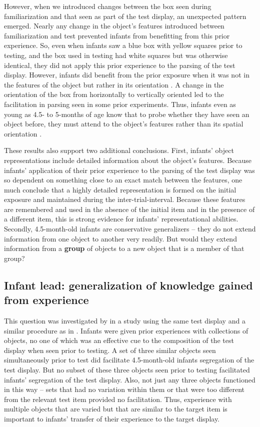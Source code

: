 However, when we introduced changes between the box seen during
familiarization and that seen as part of the test display, an
unexpected pattern emerged.  Nearly any change in the object's
features introduced between familiarization and test prevented infants
from benefitting from this prior experience.  So, even when infants
saw a blue box with yellow squares prior to testing, and the box used
in testing had white squares but was otherwise identical, they did not
apply this prior experience to the parsing of the test display.
However, infants did benefit from the prior exposure when it was not
in the features of the object but rather in its orientation 
 \cite{needham01object}.  
A change in the orientation of the box from horizontally to
vertically oriented led to the facilitation in parsing seen in some
prior experiments.  Thus, infants even as young as 4.5- to 5-months of
age know that to probe whether they have seen an object before, they
must attend to the object's features rather than its spatial
orientation \cite{needham01object}.

These results also support two additional conclusions.  First,
infants' object representations include detailed information
about the object's features.  Because infants'
application of their prior experience to the parsing of the test
display was so dependent on something close to an exact match between
the features, one much conclude that a highly detailed representation
is formed on the initial exposure and maintained during the
inter-trial-interval.  Because these features are remembered and used
in the absence of the initial item and in the presence of a different
item, this is strong evidence for infants' representational
abilities.  Secondly, 4.5-month-old infants are conservative
generalizers -- they do not extend information from one object to
another very readily.  But would they extend information from a {\bf group}
of objects to a new object that is a member of that group?



\subsection{Infant lead: generalization of knowledge gained from experience}

This question was investigated by 
in a study using the same test display and a similar procedure as in
.  Infants were given prior experiences with collections
of objects, no one of which was an effective cue to the composition of
the test display when seen prior to testing.  A set of three similar
objects seen simultaneously prior to test did facilitate 4.5-month-old
infants segregation of the test display.  But no subset of these three
objects seen prior to testing facilitated infants' segregation of the
test display.  Also, not just any three objects functioned in this way
-- sets that had no variation within them or that were too different
from the relevant test item provided no facilitation.  Thus,
experience with multiple objects that are varied but that are similar
to the target item is important to infants' transfer of their
experience to the target display.



